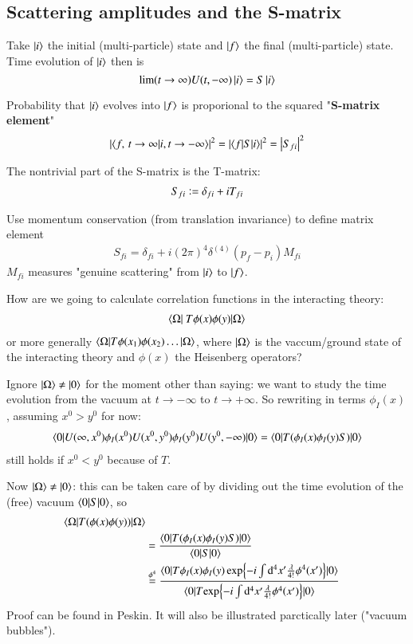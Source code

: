 \subsection{Scattering amplitudes and the S-matrix}
Take $\ket{i}$ the initial (multi-particle) state and $\ket{f}$ the final (multi-particle) state. Time evolution of $\ket{i}$ then is
$$\lim(t\rightarrow\infty)U(t,-\infty) \ket{i} = S \ket{i}$$

Probability that $\ket{i}$ evolves into $\ket{f}$ is proporional to the squared "\textbf{S-matrix element}"
\begin{align}
	\left|	\braket{f,\, t\to \infty | i, t\rightarrow - \infty}\right|^2 = \left| \braket{f|S|i} \right|^2 = \left| S_{fi} \right|^2
\end{align}

The nontrivial part of the S-matrix is the T-matrix:
\begin{align}
	S_{fi} \vcentcolon = \delta_{fi} + iT_{fi}
\end{align}

Use momentum conservation (from translation invariance) to define matrix element
\begin{align}
	S_{fi} = \delta_{fi} + i(2\pi)^4 \delta^{(4)}(p_f - p_i) M_{fi}
\end{align}
$M_{fi}$ measures "genuine scattering" from $\ket{i}$ to $\ket{f}$.

How are we going to calculate correlation functions in the interacting theory:
\begin{align}
	\braket{\Omega |  \ T \phi(x)\phi(y) | \Omega}	
\end{align}
or more generally $\braket{\Omega | T \phi(x_1)\phi(x_2)\dots | \Omega}$, where $\ket{\Omega}$ is the vaccum/ground state of the interacting theory and $\phi(x)$ the Heisenberg operators?

Ignore $\ket{\Omega} \neq \ket{0}$ for the moment other than saying: we want to study the time evolution from the vacuum at $t\rightarrow - \infty$ to $t \rightarrow + \infty$. So rewriting in terms $\phi_I(x)$, assuming $x^0 > y^0$ for now:
\begin{align}
	\braket{0 | U(\infty, x^0) \phi_I(x^0)  U(x^0, y^0) \phi_I(y^0)U(y^0, -\infty) | 0}  = \braket{0|T(\phi_I(x)\phi_I(y)S)|0}
\end{align}
still holds if $x^0 < y^0$ because of $T$.

Now $\ket{\Omega} \neq \ket{0}$: this can be taken care of by dividing out the time evolution of the (free) vacuum $\braket{0|S|0}$, so
\begin{align}
	\braket{\Omega | T(\phi(x)\phi(y))|\Omega} \notag\\
	&= \frac{\braket{0 | T(\phi_I(x)\phi_I(y)S)|0}}{\braket{0|S|0}} \\
	&\stackrel{\phi^4}{=} 
	\frac{\braket{0 | T {\phi_I(x)\phi_I(y)\exp{-i\int\dd^4x' \frac{\lambda}{4!}\phi^4(x')}}| 0}}
	{\braket{0 | T {\exp{-i\int\dd^4x' \frac{\lambda}{4!}\phi^4(x')}}| 0}
}\notag
\end{align}
Proof can be found in Peskin. It will also be illustrated parctically later ("vacuum bubbles").

